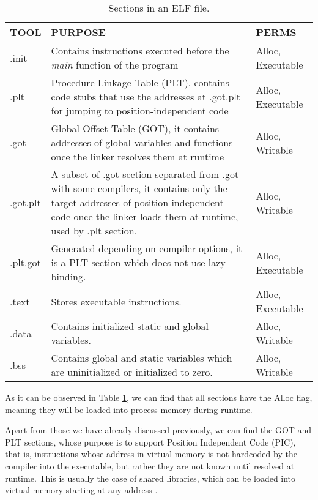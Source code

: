 \begin{table}[htbp]
\begin{tabular}{|>{\centering\arraybackslash}p{1cm}|>{\centering\arraybackslash}p{9cm}|>{\centering\arraybackslash}p{2cm}|}
\hline
\textbf{TOOL} & \textbf{PURPOSE} & \textbf{PERMS}\\
\hline
\hline
.init & Contains instructions executed before the \textit{main} function of the program & Alloc, Executable\\
\hline
.plt & Procedure Linkage Table (PLT), contains code stubs that use the addresses at .got.plt for jumping to position-independent code & Alloc, Executable\\
\hline
.got & Global Offset Table (GOT), it contains addresses of global variables and functions once the linker resolves them at runtime & Alloc, Writable\\
\hline
.got.plt & A subset of .got section separated from .got with some compilers, it contains only the target addresses of position-independent code once the linker loads them at runtime, used by .plt section. & Alloc, Writable\\
\hline
.plt.got & Generated depending on compiler options, it is a PLT section which does not use lazy binding. & Alloc, Executable\\
\hline
.text & Stores executable instructions. & Alloc, Executable\\
\hline
.data & Contains initialized static and global variables. & Alloc, Writable\\
\hline
.bss & Contains global and static variables which are uninitialized or initialized to zero. & Alloc, Writable\\
\hline 
\end{tabular}
\caption{Sections in an ELF file.}
\label{table:elf_sec_headers}
\end{table}

As it can be observed in Table \ref{table:elf_sec_headers}, we can find that all sections have the Alloc flag, meaning they will be loaded into process memory during runtime.

Apart from those we have already discussed previously, we can find the GOT and PLT sections, whose purpose is to support Position Independent Code (PIC), that is, instructions whose address in virtual memory is not hardcoded by the compiler into the executable, but rather they are not known until resolved at runtime. This is usually the case of shared libraries, which can be loaded into virtual memory starting at any address \cite{plt_got_overlord}.

